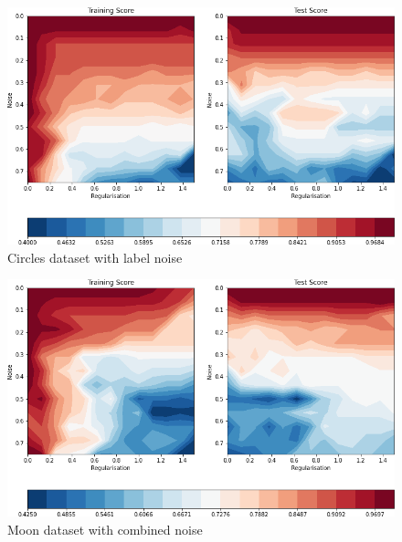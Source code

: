 \documentclass[9.5pt]{beamer}
\begin{document}
    \begin{frame}{}
        \begin{figure}
            \centering
            \includegraphics[width=\linewidth]{images/circles_label}
            \caption{Circles dataset with label noise}
        \end{figure}
    \end{frame}
    \begin{frame}{}
        \begin{figure}
            \centering
            \includegraphics[width=\linewidth]{images/moon_combined}
            \caption{Moon dataset with combined noise}
        \end{figure}
    \end{frame}
\end{document}
